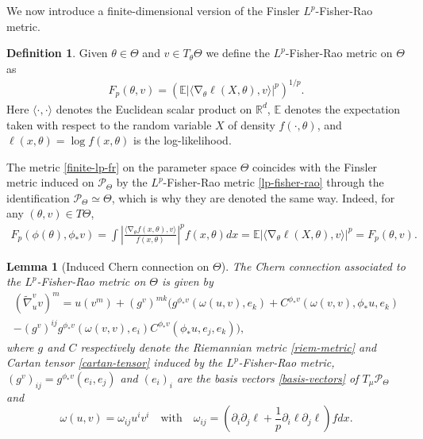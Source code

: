 \documentclass[11pt]{amsart}
\newtheorem{lemma}[theorem]{Lemma}
\theoremstyle{definition}
\newtheorem{definition}[theorem]{Definition}
\DeclareMathOperator{\grad}{\nabla}
\newcommand{\R}{\mathbb R}
\newcommand{\E}{\mathbb E}
\newcommand{\nablatilde}{\tilde{\nabla}}
\begin{document}
We now introduce a finite-dimensional version of the Finsler $L^p$-Fisher-Rao metric.
\begin{definition}
Given $\theta\in\Theta$ and $v\in T_\theta\Theta$ we define the $L^p$-Fisher-Rao metric on $\Theta$ as
\begin{align}\label{finite-lp-fr}
    F_p(\theta,v)=\left(\E|\langle \grad_\theta \ell(X,\theta), v\rangle|^p\right)^{1/p}.
\end{align}
Here $\langle\cdot,\cdot\rangle$ denotes the Euclidean scalar product on $\R^d$, $\E$ denotes the expectation taken with respect to the random variable $X$ of density $f(\cdot,\theta)$, and $\ell(x,\theta)=\log f(x,\theta)$ is the log-likelihood.
\end{definition}
The metric \eqref{finite-lp-fr} on the parameter space $\Theta$ coincides with the Finsler metric induced on $\mathcal P_\Theta$ by the $L^p$-Fisher-Rao metric \eqref{lp-fisher-rao} through the identification $\mathcal P_\Theta \simeq \Theta$, which is why they are denoted the same way. Indeed, for any $(\theta,v)\in T\Theta$, 
    \begin{align*}
    F_p(\phi(\theta),\phi_*v)=\int\left|\frac{\langle \grad_\theta f(x,\theta),v\rangle}{f(x,\theta)}\right|^p f(x,\theta)dx
    =\E|\langle \grad_\theta \ell(X,\theta),v\rangle|^p=F_p(\theta,v).
    \end{align*}
\begin{lemma}[Induced Chern connection on $\Theta$]
The Chern connection associated to the $L^p$-Fisher-Rao metric on $\Theta$ is given by
\begin{multline}\label{finite-chern-1}
(\nablatilde^v_uv)^m= u(v^m) + (g^v)^{mk}\big( g^{\phi_*v}(\omega(u,v),e_k) + C^{\phi_*v}(\omega(v,v),\phi_*u,e_k)\\
-(g^v)^{ij}g^{\phi_*v}(\omega(v,v),e_i)C^{\phi_*v}(\phi_*u,e_j,e_k)\big),
\end{multline}
where $g$ and $C$ respectively denote the Riemannian metric \eqref{riem-metric} and Cartan tensor \eqref{cartan-tensor} induced by the $L^p$-Fisher-Rao metric, $(g^v)_{ij}=g^{\phi_*v}(e_i,e_j)$ and $(e_i)_i$ are the basis vectors \eqref{basis-vectors} of $T_\mu\mathcal P_\Theta$ and
\begin{equation}\label{omega}
\omega(u,v)=\omega_{ij}u^iv^i \quad \text{with} \quad \omega_{ij}=\left(\partial_i\partial_j\ell+\frac{1}{p}\partial_i\ell\partial_j\ell\right)fdx.
\end{equation}
\end{lemma}
\end{document}

